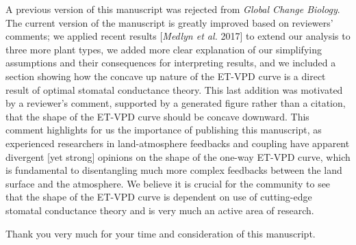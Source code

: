 \documentclass[10pt,stdletter,dateno]{newlfm}
\begin{document}
\begin{newlfm}
  A previous version of this manuscript was rejected from \textit{Global Change Biology}. The current version of the manuscript is greatly improved based on reviewers' comments; we applied recent results [\textit{Medlyn et al.} 2017] to extend our analysis to three more plant types, we added more clear explanation of our simplifying assumptions and their consequences for interpreting results, and we included a section showing how the concave up nature of the ET-VPD curve is a direct result of optimal stomatal conductance theory. This last addition was motivated by a reviewer's comment, supported by a generated figure rather than a citation, that the shape of the ET-VPD curve should be concave downward. This comment highlights for us the importance of publishing this manuscript, as experienced researchers in land-atmosphere feedbacks and coupling have apparent divergent [yet strong] opinions on the shape of the one-way ET-VPD curve, which is fundamental to disentangling much more complex feedbacks between the land surface and the atmosphere. We believe it is crucial for the community to see that the shape of the ET-VPD curve is dependent on use of cutting-edge stomatal conductance theory and is very much an active area of research.

    Thank you very much for your time and consideration of this manuscript.
  

\end{newlfm}
\end{document}
